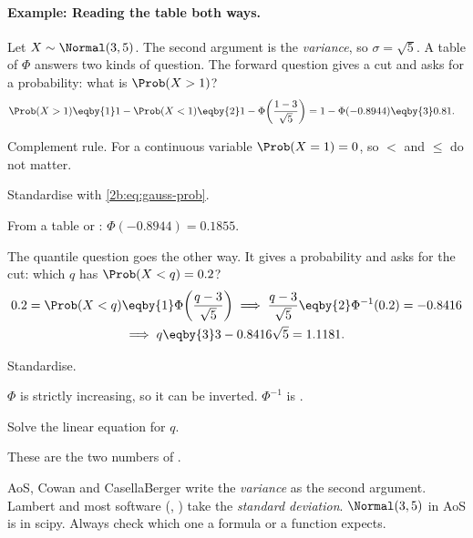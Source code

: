 \paragraph{Example: Reading the table both ways.}
\label{2b:ex:aos-gauss}
Let $X\sim\Normal(3,5)$. The second argument is the \emph{variance}, so $\sigma=\sqrt5$. A table of $\Phi$ answers two kinds of question. The forward question gives a cut and asks for a probability: what is $\Prob(X>1)$?
\begin{align*}
  \Prob(X>1)
  &\eqby{1} 1-\Prob(X<1)
  \eqby{2} 1-\Phi\!\left(\frac{1-3}{\sqrt5}\right)
  = 1-\Phi(-0.8944)
  \eqby{3} 0.81 .
\end{align*}
\begin{explain}
  \item Complement rule. For a continuous variable $\Prob(X=1)=0$, so $<$ and $\le$ do not matter.
  \item Standardise with \eqref{2b:eq:gauss-prob}.
  \item From a table or : $\Phi(-0.8944)=0.1855$.
\end{explain}
The quantile question goes the other way. It gives a probability and asks for the cut: which $q$ has $\Prob(X<q)=0.2$?
\begin{align*}
  0.2=\Prob(X<q)
  &\eqby{1} \Phi\!\left(\frac{q-3}{\sqrt5}\right)
  \;\Longrightarrow\; \frac{q-3}{\sqrt5}\eqby{2}\Phi^{-1}(0.2)=-0.8416 \\
  &\;\Longrightarrow\; q\eqby{3}3-0.8416\sqrt5=1.1181 .
\end{align*}
\begin{explain}
  \item Standardise.
  \item $\Phi$ is strictly increasing, so it can be inverted. $\Phi^{-1}$ is .
  \item Solve the linear equation for $q$.
\end{explain}
These are the two numbers of .

\begin{pitfall}
AoS, Cowan and CasellaBerger write the \emph{variance} as the second argument. Lambert and most software (, ) take the \emph{standard deviation}. $\Normal(3,5)$ in AoS is  in scipy. Always check which one a formula or a function expects.
\end{pitfall}

